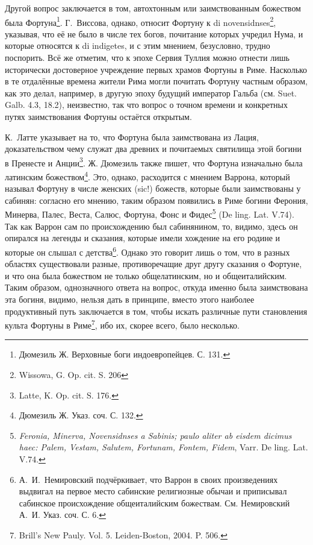 Другой вопрос заключается в том, автохтонным или заимствованным божеством была Фортуна\footnote{Дюмезиль Ж. Верховные боги индоевропейцев. С. 131.}. Г.~Виссова, однако, относит Фортуну к di novensidnses\footnote{Wissowa, G. Op. cit. S. 206}, указывая, что её не было в числе тех богов, почитание которых учредил Нума, и которые относятся к di indigetes, и с этим мнением, безусловно, трудно поспорить. Всё же отметим, что к эпохе Сервия Туллия можно отнести лишь исторически достоверное учреждение первых храмов Фортуны в Риме. Насколько в те отдалённые времена жители Рима могли почитать Фортуну частным образом, как это делал, например, в другую эпоху будущий император Гальба (см. Suet. Galb. 4.3, 18.2), неизвестно, так что вопрос о точном времени и конкретных путях заимствования Фортуны остаётся открытым.

К.~Латте указывает на то, что Фортуна была заимствована из Лация, доказательством чему служат два древних и почитаемых святилища этой богини в Пренесте и Анции\footnote{Latte, K. Op. cit. S. 176.}. Ж. Дюмезиль также пишет, что Фортуна изначально была латинским божеством\footnote{Дюмезиль Ж. Указ. соч. С. 132.}. Это, однако, расходится с мнением Варрона, который называл Фортуну в числе женских (sic!) божеств, которые были заимствованы у сабинян: согласно его мнению, таким образом появились в Риме богини Ферония, Минерва, Палес, Веста, Салюс, Фортуна, Фонс и Фидес\footnote{\textit{Feronia, Minerva, Novensidnses a Sabinis; paulo aliter ab eisdem dicimus haec: Palem, Vestam, Salutem, Fortunam, Fontem, Fidem}, Varr. De ling. Lat. V.74.} (De ling. Lat. V.74). Так как Варрон сам по происхождению был сабинянином, то, видимо, здесь он опирался на легенды и сказания, которые имели хождение на его родине и которые он слышал с детства\footnote{А.~И.~Немировский подчёркивает, что Варрон в своих произведениях выдвигал на первое место сабинские религиозные обычаи и приписывал сабинское происхождение общеиталийским божествам. См. Немировский А.~И. Указ. соч. С. 6.}. Однако это говорит лишь о том, что в разных областях существовали разные, противоречащие друг другу сказания о Фортуне, и что она была божеством не только общелатинским, но и общеиталийским. Таким образом, однозначного ответа на вопрос, откуда именно была заимствована эта богиня, видимо, нельзя дать в принципе, вместо этого наиболее продуктивный путь заключается в том, чтобы искать различные пути становления культа Фортуны в Риме\footnote{Brill’s New Pauly. Vol. 5. Leiden-Boston, 2004. P. 506.}, ибо их, скорее всего, было несколько.

